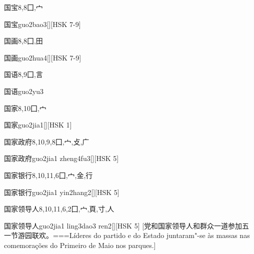 \begin{Entry}{国宝}{8,8}{⼞,⼧}
  \begin{Phonetics}{国宝}{guo2bao3}[][HSK 7-9]
  \end{Phonetics}
\end{Entry}

\begin{Entry}{国画}{8,8}{⼞,⽥}
  \begin{Phonetics}{国画}{guo2hua4}[][HSK 7-9]
  \end{Phonetics}
\end{Entry}

\begin{Entry}{国语}{8,9}{⼞,⾔}
  \begin{Phonetics}{国语}{guo2yu3}
  \end{Phonetics}
\end{Entry}

\begin{Entry}{国家}{8,10}{⼞,⼧}
  \begin{Phonetics}{国家}{guo2jia1}[][HSK 1]
  \end{Phonetics}
\end{Entry}

\begin{Entry}{国家政府}{8,10,9,8}{⼞,⼧,⽁,⼴}
  \begin{Phonetics}{国家政府}{guo2jia1 zheng4fu3}[][HSK 5]
  \end{Phonetics}
\end{Entry}

\begin{Entry}{国家银行}{8,10,11,6}{⼞,⼧,⾦,⾏}
  \begin{Phonetics}{国家银行}{guo2jia1 yin2hang2}[][HSK 5]
  \end{Phonetics}
\end{Entry}

\begin{Entry}{国家领导人}{8,10,11,6,2}{⼞,⼧,⾴,⼨,⼈}
  \begin{Phonetics}{国家领导人}{guo2jia1 ling3dao3 ren2}[][HSK 5]
    [党和国家领导人和群众一道参加五一节游园联欢。===Líderes do partido e do Estado juntaram"-se às massas nas comemorações do Primeiro de Maio nos parques.]
  \end{Phonetics}
\end{Entry}

